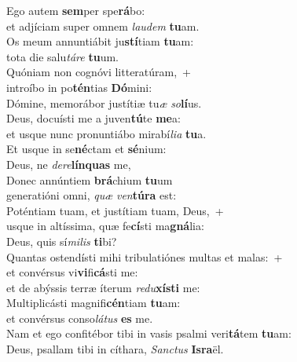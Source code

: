 \evenverse Ego autem \textbf{sem}per spe\textbf{rá}bo:~\*\\
\evenverse et adjíciam super omnem \textit{lau}\textit{dem} \textbf{tu}am.\\
\oddverse Os meum annuntiábit ju\textbf{stí}tiam \textbf{tu}am:~\*\\
\oddverse tota die salu\textit{tá}\textit{re} \textbf{tu}um.\\
\evenverse Quóniam non cognóvi litteratúram,~+\\
\evenverse  introíbo in po\textbf{tén}tias \textbf{Dó}mini:~\*\\
\evenverse Dómine, memorábor justítiæ tu\textit{æ} \textit{so}\textbf{lí}us.\\
\oddverse Deus, docuísti me a juven\textbf{tú}te \textbf{me}a:~\*\\
\oddverse et usque nunc pronuntiábo mirabí\textit{li}\textit{a} \textbf{tu}a.\\
\evenverse Et usque in se\textbf{né}ctam et \textbf{sé}nium:~\*\\
\evenverse Deus, ne \textit{de}\textit{re}\textbf{lín}\textbf{quas} me,\\
\oddverse Donec annúntiem \textbf{brá}chium \textbf{tu}um~\*\\
\oddverse generatióni omni, \textit{quæ} \textit{ven}\textbf{tú}\textbf{ra} est:\\
\evenverse Poténtiam tuam, et justítiam tuam, Deus,~+\\
\evenverse  usque in altíssima, quæ fe\textbf{cí}sti ma\textbf{gná}lia:~\*\\
\evenverse Deus, quis sí\textit{mi}\textit{lis} \textbf{ti}bi?\\
\oddverse Quantas ostendísti mihi tribulatiónes multas et malas:~+\\
\oddverse  et convérsus vi\textbf{vi}fi\textbf{cá}sti me:~\*\\
\oddverse et de abýssis terræ íterum \textit{re}\textit{du}\textbf{xí}\textbf{sti} me:\\
\evenverse Multiplicásti magnifi\textbf{cén}tiam \textbf{tu}am:~\*\\
\evenverse et convérsus conso\textit{lá}\textit{tus} \textbf{es} me.\\
\oddverse Nam et ego confitébor tibi in vasis psalmi veri\textbf{tá}tem \textbf{tu}am:~\*\\
\oddverse Deus, psallam tibi in cíthara, \textit{San}\textit{ctus} \textbf{Is}\textbf{ra}ël.\\

